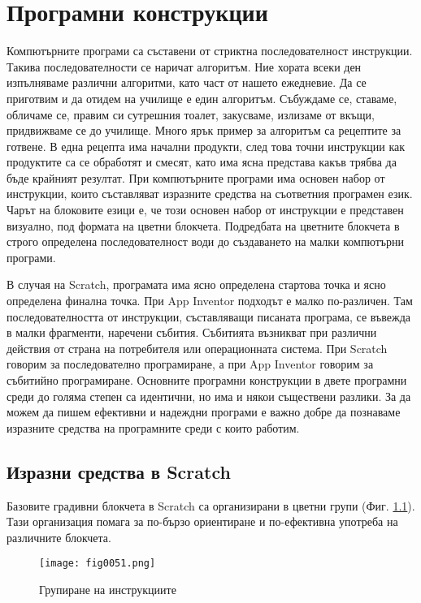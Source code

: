\chapter{Програмни конструкции}

Компютърните програми са съставени от стриктна последователност инструкции. Такива последователности се наричат алгоритъм. Ние хората всеки ден изпълняваме различни алгоритми, като част от нашето ежедневие. Да се приготвим и да отидем на училище е един алгоритъм. Събуждаме се, ставаме, обличаме се, правим си сутрешния тоалет, закусваме, излизаме от вкъщи, придвижваме се до училище. Много ярък пример за алгоритъм са рецептите за готвене. В една рецепта има начални продукти, след това точни инструкции как продуктите са се обработят и смесят, като има ясна представа какъв трябва да бъде крайният резултат. При компютърните програми има основен набор от инструкции, които съставляват изразните средства на съответния програмен език. Чарът на блоковите езици е, че този основен набор от инструкции е представен визуално, под формата на цветни блокчета. Подредбата на цветните блокчета в строго определена последователност води до създаването на малки компютърни програми. 

В случая на Scratch, програмата има ясно определена стартова точка и ясно определена финална точка. При App Inventor подходът е малко по-различен. Там последователността от инструкции, съставляващи писаната програма, се въвежда в малки фрагменти, наречени събития. Събитията възникват при различни действия от страна на потребителя или операционната система. При Scratch говорим за последователно програмиране, а при App Inventor говорим за събитийно програмиране. Основните програмни конструкции в двете програмни среди до голяма степен са идентични, но има и някои съществени разлики. За да можем да пишем ефективни и надеждни програми е важно добре да познаваме изразните средства на програмните среди с които работим. 

\section{Изразни средства в Scratch}

Базовите градивни блокчета в Scratch са организирани в цветни групи (Фиг. \ref{fig0051}). Тази организация помага за по-бързо ориентиране и по-ефективна употреба на различните блокчета. 

\begin{figure}[H]
  \centering
  \texttt{[image: fig0051.png]}
  \caption{Групиране на инструкциите}
\label{fig0051}
\end{figure}

